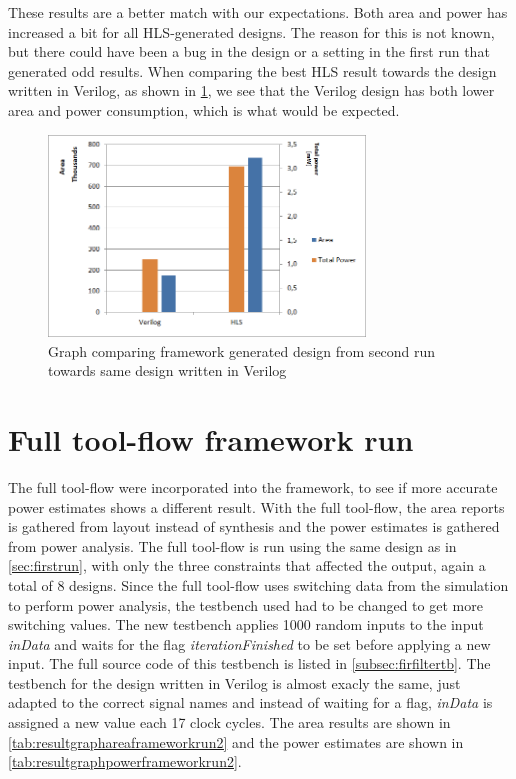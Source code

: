 These results are a better match with our expectations. Both area and power has increased a bit for all HLS-generated designs. The reason for this is not known, but there could have been a bug in the design or a setting in the first run that generated odd results. When comparing the best HLS result towards the design written in Verilog, as shown in \cref{fig:resultcomparisonhlsrun2}, we see that the Verilog design has both lower area and power consumption, which is what would be expected.

\begin{figure}[hbpt]
\centering
\includegraphics[width=0.75\textwidth]{../figs/resultComparison2.png}
\caption{\label{fig:resultcomparisonhlsrun2}Graph comparing framework generated design from second run towards same design written in Verilog}
\end{figure}

\section{\label{sec:fullflowresults}Full tool-flow framework run}
The full tool-flow were incorporated into the framework, to see if more accurate power estimates shows a different result. With the full tool-flow, the area reports is gathered from layout instead of synthesis and the power estimates is gathered from power analysis. The full tool-flow is run using the same design as in \cref{sec:firstrun}, with only the three constraints that affected the output, again a total of 8 designs. Since the full tool-flow uses switching data from the simulation to perform power analysis, the testbench used had to be changed to get more switching values. The new testbench applies 1000 random inputs to the input \textit{inData} and waits for the flag \textit{iterationFinished} to be set before applying a new input. The full source code of this testbench is listed in \cref{subsec:firfiltertb}. The testbench for the design written in Verilog is almost exacly the same, just adapted to the correct signal names and instead of waiting for a flag, \textit{inData} is assigned a new value each 17 clock cycles. The area results are shown in \cref{tab:resultgraphareaframeworkrun2} and the power estimates are shown in \cref{tab:resultgraphpowerframeworkrun2}.

